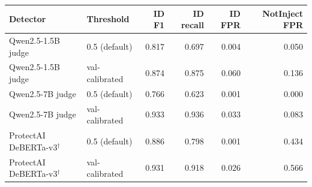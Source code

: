 \begin{tabular}{llrrrr}
\toprule
Detector & Threshold & ID F1 & ID recall & ID FPR & NotInject FPR \\
\midrule
Qwen2.5-1.5B judge & 0.5 (default) & 0.817 & 0.697 & 0.004 & 0.050 \\
Qwen2.5-1.5B judge & val-calibrated & 0.874 & 0.875 & 0.060 & 0.136 \\
\addlinespace
Qwen2.5-7B judge & 0.5 (default) & 0.766 & 0.623 & 0.001 & 0.000 \\
Qwen2.5-7B judge & val-calibrated & 0.933 & 0.936 & 0.033 & 0.083 \\
\addlinespace
ProtectAI DeBERTa-v3$^\dagger$ & 0.5 (default) & 0.886 & 0.798 & 0.001 & 0.434 \\
ProtectAI DeBERTa-v3$^\dagger$ & val-calibrated & 0.931 & 0.918 & 0.026 & 0.566 \\
\bottomrule
\end{tabular}